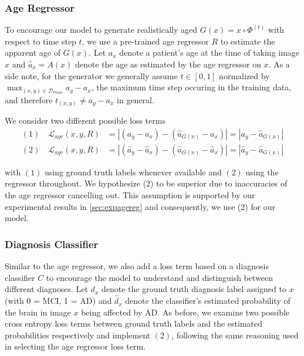 \subsubsection*{Age Regressor} \label{sec:adaagereg}
To encourage our model to generate realistically aged $G(x) = x \circ \Phi^{(t)} $ with respect to time step $t$, we use a pre-trained age regressor $R$ to estimate the apparent age of $G(x)$.
Let $ a_x $ denote a patient's age at the time of taking image $x$ and $ \hat a_x = A(x)$ denote the age as estimated by the age regressor on $x$. As a side note, for the generator we generally assume $t \in [0, 1]$ normalized by $\max_{(x, y) \in \mathcal{D}_{train}} a_y - a_x $, the maximum time step occuring in the training data, and therefore $t_{(x, y)} \neq a_y - a_x$ in general.

We consider two different possible loss terms 
\begin{equation}
	\begin{split}
		(1) \quad \mathcal{L}_{age}(x, y, R) & = 
		| (a_y - a_x) - (\hat a_{G(x)} - a_x) | =
		| a_y - \hat a_{G(x)} | \\[8pt]
		(2) \quad \mathcal{L}_{age}(x, y, R) & =
		| (\hat a_y - \hat a_x) - (\hat a_{G(x)} - \hat a_x) | = 
		| \hat a_y - \hat a_{G(x)} |
	\end{split}
\end{equation}

with $(1)$ using ground truth labels whenever available and $(2)$ using the regressor throughout. We hypothesize (2) to be superior due to inaccuracies of the age regressor cancelling out. This assumption is supported by our experimental results in \autoref{sec:expagereg} and consequently, we use (2) for our model.

\subsubsection*{Diagnosis Classifier}
Similar to the age regressor, we also add a loss term based on a diagnosis classifier $C$ to encourage the model to understand and distinguish between different diagnoses. Let $d_x$ denote the ground truth diagnosis label assigned to $x$ (with 0 = MCI, 1 = AD) and $\hat d_x$ denote the classifier's estimated probability of the brain in image $x$ being affected by AD. As before, we examine two possible cross entropy loss terms between ground truth labels and the estimated probabilities respectively and implement $(2)$, following the same reasoning used in selecting the age regressor loss term.

